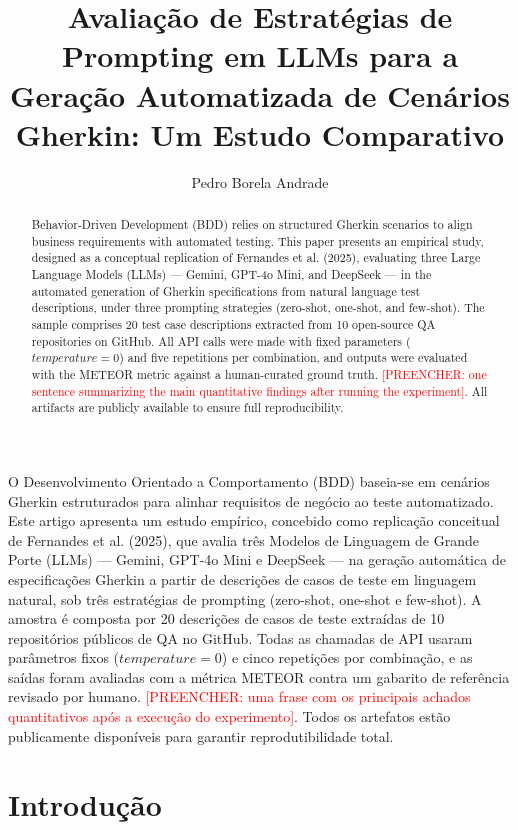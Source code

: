 \documentclass[12pt]{article}
\title{Avaliação de Estratégias de Prompting em LLMs para a Geração Automatizada de Cenários Gherkin: Um Estudo Comparativo}
\author{Pedro Borela Andrade\inst{1}}
\newcommand{\preencher}[1]{\textcolor{red}{[PREENCHER: #1]}}
\begin{document}
\maketitle

\begin{abstract}
  Behavior-Driven Development (BDD) relies on structured Gherkin scenarios to align business requirements with automated testing. This paper presents an empirical study, designed as a conceptual replication of Fernandes et al. (2025), evaluating three Large Language Models (LLMs) --- Gemini, GPT-4o Mini, and DeepSeek --- in the automated generation of Gherkin specifications from natural language test descriptions, under three prompting strategies (zero-shot, one-shot, and few-shot). The sample comprises 20 test case descriptions extracted from 10 open-source QA repositories on GitHub. All API calls were made with fixed parameters ($temperature=0$) and five repetitions per combination, and outputs were evaluated with the METEOR metric against a human-curated ground truth. \preencher{one sentence summarizing the main quantitative findings after running the experiment}. All artifacts are publicly available to ensure full reproducibility.
\end{abstract}

\begin{resumo}
  O Desenvolvimento Orientado a Comportamento (BDD) baseia-se em cenários Gherkin estruturados para alinhar requisitos de negócio ao teste automatizado. Este artigo apresenta um estudo empírico, concebido como replicação conceitual de Fernandes et al. (2025), que avalia três Modelos de Linguagem de Grande Porte (LLMs) --- Gemini, GPT-4o Mini e DeepSeek --- na geração automática de especificações Gherkin a partir de descrições de casos de teste em linguagem natural, sob três estratégias de prompting (zero-shot, one-shot e few-shot). A amostra é composta por 20 descrições de casos de teste extraídas de 10 repositórios públicos de QA no GitHub. Todas as chamadas de API usaram parâmetros fixos ($temperature=0$) e cinco repetições por combinação, e as saídas foram avaliadas com a métrica METEOR contra um gabarito de referência revisado por humano. \preencher{uma frase com os principais achados quantitativos após a execução do experimento}. Todos os artefatos estão publicamente disponíveis para garantir reprodutibilidade total.
\end{resumo}

\section{Introdução}
\end{document}
